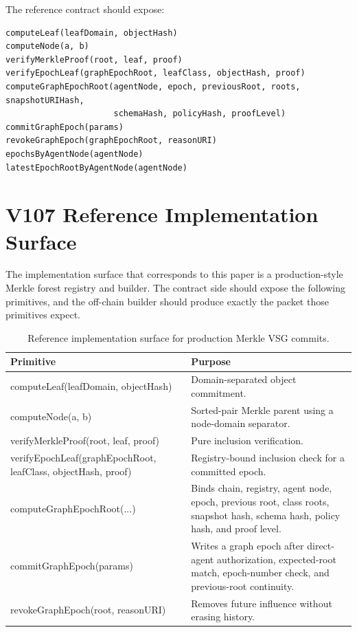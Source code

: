 \documentclass[11pt,letterpaper]{article}
\begin{document}
The reference contract should expose:
\begin{lstlisting}[caption={Minimal registry methods.}]
computeLeaf(leafDomain, objectHash)
computeNode(a, b)
verifyMerkleProof(root, leaf, proof)
verifyEpochLeaf(graphEpochRoot, leafClass, objectHash, proof)
computeGraphEpochRoot(agentNode, epoch, previousRoot, roots, snapshotURIHash,
                      schemaHash, policyHash, proofLevel)
commitGraphEpoch(params)
revokeGraphEpoch(graphEpochRoot, reasonURI)
epochsByAgentNode(agentNode)
latestEpochRootByAgentNode(agentNode)
\end{lstlisting}


\section{V107 Reference Implementation Surface}
The implementation surface that corresponds to this paper is a production-style Merkle forest registry and builder. The contract side should expose the following primitives, and the off-chain builder should produce exactly the packet those primitives expect.

\begin{table}[H]
\small
\centering
\begin{tabularx}{\textwidth}{>{\ttfamily}p{2.35in}Y}
\toprule
\textnormal{Primitive} & Purpose\\
\midrule
computeLeaf(leafDomain, objectHash) & Domain-separated object commitment.\\
computeNode(a, b) & Sorted-pair Merkle parent using a node-domain separator.\\
verifyMerkleProof(root, leaf, proof) & Pure inclusion verification.\\
verifyEpochLeaf(graphEpochRoot, leafClass, objectHash, proof) & Registry-bound inclusion check for a committed epoch.\\
computeGraphEpochRoot(...) & Binds chain, registry, agent node, epoch, previous root, class roots, snapshot hash, schema hash, policy hash, and proof level.\\
commitGraphEpoch(params) & Writes a graph epoch after direct-agent authorization, expected-root match, epoch-number check, and previous-root continuity.\\
revokeGraphEpoch(root, reasonURI) & Removes future influence without erasing history.\\
\bottomrule
\end{tabularx}
\caption{Reference implementation surface for production Merkle VSG commits.}
\end{table}
\end{document}
